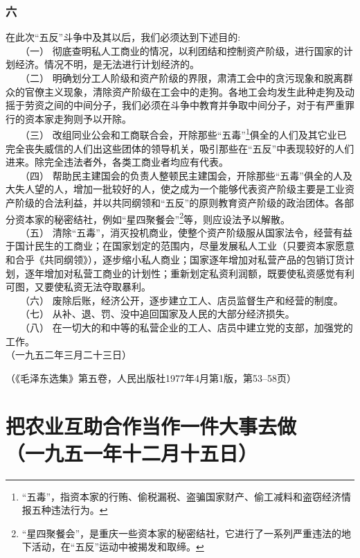 \documentclass[cn,11pt,chinese]{elegantbook}
\def\myformat#1{\hfil\hfil #1}
\begin{document}
\subsubsection*{\myformat{六}}
在此次“五反”斗争中及其以后，我们必须达到下述目的:\\
　　（一） 彻底查明私人工商业的情况，以利团结和控制资产阶级，进行国家的计划经济。情况不明，是无法进行计划经济的。\\
　　（二） 明确划分工人阶级和资产阶级的界限，肃清工会中的贪污现象和脱离群众的官僚主义现象，清除资产阶级在工会中的走狗。各地工会均发生此种走狗及动摇于劳资之间的中间分子，我们必须在斗争中教育并争取中间分子，对于有严重罪行的资本家走狗则予以开除。\\
　　（三） 改组同业公会和工商联合会，开除那些“五毒”\footnote[1]{“五毒”，指资本家的行贿、偷税漏税、盗骗国家财产、偷工减料和盗窃经济情报五种违法行为。}俱全的人们及其它业已完全丧失威信的人们出这些团体的领导机关，吸引那些在“五反”中表现较好的人们进来。除完全违法者外，各类工商业者均应有代表。\\
　　（四） 帮助民主建国会的负责人整顿民主建国会，开除那些“五毒”俱全的人及大失人望的人，增加一批较好的人，使之成为一个能够代表资产阶级主要是工业资产阶级的合法利益，并以共同纲领和“五反”的原则教育资产阶级的政治团体。各部分资本家的秘密结社，例如“星四聚餐会”\footnote[2]{“星四聚餐会”，是重庆一些资本家的秘密结社，它进行了一系列严重违法的地下活动，在“五反”运动中被揭发和取缔。}等，则应设法予以解散。\\
　　（五） 清除“五毒”，消灭投机商业，使整个资产阶级服从国家法令，经营有益于国计民生的工商业；在国家划定的范围内，尽量发展私人工业（只要资本家愿意和合乎《共同纲领》），逐步缩小私人商业；国家逐年增加对私营产品的包销订货计划，逐年增加对私营工商业的计划性；重新划定私资利润额，既要使私资感觉有利可图，又要使私资无法夺取暴利。\\
　　（六） 废除后账，经济公开，逐步建立工人、店员监督生产和经营的制度。\\
　　（七） 从补、退、罚、没中追回国家及人民的大部分经济损失。\\
　　（八） 在一切大的和中等的私营企业的工人、店员中建立党的支部，加强党的工作。\\
（一九五二年三月二十三日）\\
\begin{flushright}（《毛泽东选集》第五卷，人民出版社1977年4月第1版，第53--58页）\end{flushright}
\newpage\section*{\myformat{把农业互助合作当作一件大事去做}\\\myformat{（一九五一年十二月十五日）}}
\end{document}

